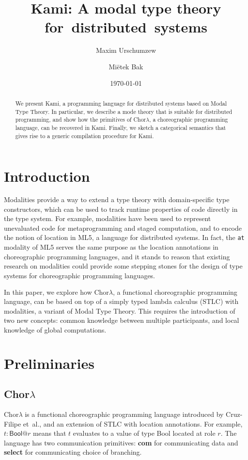 \documentclass{scrartcl}
\title{Kami: A modal type theory for~distributed~systems}
\author{Maxim Urschumzew \and Miëtek Bak}
\date{\today}
\theoremstyle{definition}
\theoremstyle{plain}
\newcommand{\primitive}[1]{\textsf{\textbf{#1}}}
\begin{document}
\maketitle
\begin{abstract}
  \noindent
  We present Kami, a programming language for distributed systems based on
  Modal Type Theory\cite{gratzer2023syntax}. In particular, we describe a mode
  theory that is suitable for distributed programming, and show how the
  primitives of Chor$\lambda$\cite{cruz2022functional}, a choreographic
  programming language, can be recovered in Kami. Finally, we sketch a
  categorical semantics that gives rise to a generic compilation procedure for
  Kami.
\end{abstract}

\section{Introduction}
Modalities provide a way to extend a type theory with domain-specific type
constructors, which can be used to track runtime properties of code directly in
the type system. For example, modalities have been used to represent
unevaluated code for metaprogramming and staged
computation\cite{davies2001modal}, and to encode the notion of location in
ML5\cite{murphy2008modal}, a language for distributed systems. In fact, the
\texttt{at} modality of ML5 serves the same purpose as the location annotations
in choreographic programming languages\cite{cruz2022functional,
giallorenzo2024choral}, and it stands to reason that existing research on
modalities could provide some stepping stones for the design of type systems
for choreographic programming languages.

In this paper, we explore how Chor$\lambda$\cite{cruz2022functional}, a
functional choreographic programming language, can be based on top of a simply
typed lambda calculus (STLC) with modalities, a variant of Modal Type
Theory\cite{gratzer2023syntax}. This requires the introduction of two new
concepts: common knowledge between multiple participants, and local knowledge
of global computations.

\section{Preliminaries}
\subsection{\texorpdfstring{Chor$\lambda$}{ChorLambda}}
Chor$\lambda$\cite{cruz2022functional} is a functional choreographic
programming language introduced by Cruz-Filipe et~al., and an extension of STLC
with location annotations. For example, $t : \textsf{Bool} @ r$ means that $t$
evaluates to a value of type \textsf{Bool} located at role $r$. The language
has two communication primitives: \primitive{com} for communicating data and
\primitive{select} for communicating choice of branching.
\end{document}
